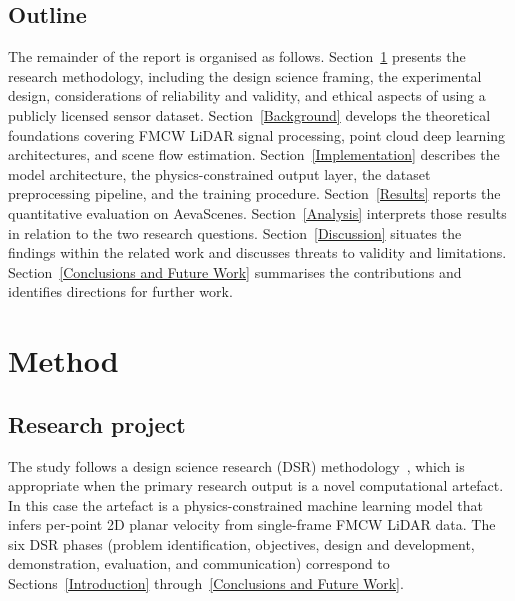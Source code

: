 \documentclass[a4paper,12pt]{article}
\begin{document}
\subsection{Outline}

The remainder of the report is organised as follows. Section~\ref{Method} presents the research methodology, including the design science framing, the experimental design, considerations of reliability and validity, and ethical aspects of using a publicly licensed sensor dataset. Section~\ref{Background} develops the theoretical foundations covering FMCW LiDAR signal processing, point cloud deep learning architectures, and scene flow estimation. Section~\ref{Implementation} describes the model architecture, the physics-constrained output layer, the dataset preprocessing pipeline, and the training procedure. Section~\ref{Results} reports the quantitative evaluation on AevaScenes. Section~\ref{Analysis} interprets those results in relation to the two research questions. Section~\ref{Discussion} situates the findings within the related work and discusses threats to validity and limitations. Section~\ref{Conclusions and Future Work} summarises the contributions and identifies directions for further work.


\newpage

%

\section{Method}
\label{Method}

\subsection{Research project}

The study follows a design science research (DSR) methodology~\cite{peffers2007ds}, which is appropriate when the primary research output is a novel computational artefact. In this case the artefact is a physics-constrained machine learning model that infers per-point 2D planar velocity from single-frame FMCW LiDAR data. The six DSR phases (problem identification, objectives, design and development, demonstration, evaluation, and communication) correspond to Sections~\ref{Introduction} through~\ref{Conclusions and Future Work}.
\end{document}
